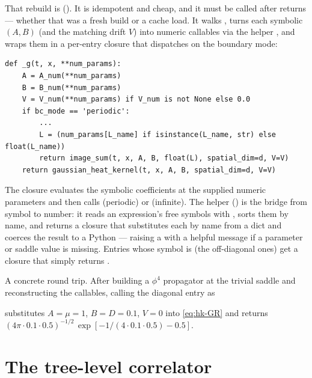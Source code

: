 That rebuild is  (). It is
idempotent and cheap, and it must be called after 
returns --- whether that was a fresh build or a cache load. It walks
, turns each symbolic $(A,B)$ (and the matching drift $V$) into
numeric callables via the helper , and wraps them in a
per-entry closure that dispatches on the boundary mode:

\begin{lstlisting}
def _g(t, x, **num_params):
    A = A_num(**num_params)
    B = B_num(**num_params)
    V = V_num(**num_params) if V_num is not None else 0.0
    if bc_mode == 'periodic':
        ...
        L = (num_params[L_name] if isinstance(L_name, str) else float(L_name))
        return image_sum(t, x, A, B, float(L), spatial_dim=d, V=V)
    return gaussian_heat_kernel(t, x, A, B, spatial_dim=d, V=V)
\end{lstlisting}

The closure evaluates the symbolic coefficients at the supplied numeric
parameters and then calls  (periodic) or
 (infinite). The helper 
() is the bridge from symbol to number: it reads an
expression's free symbols with , sorts them by name, and
returns a closure that substitutes each by name from a  dict
and coerces the result to a Python  --- raising a 
with a helpful message if a parameter or saddle value is missing. Entries whose
symbol is  (the off-diagonal ones) get a closure that simply returns
.

\begin{example}\label{ex:hk-gtx}
A concrete round trip. After building a $\phi^4$ propagator at the trivial
saddle and reconstructing the callables, calling the diagonal entry as
\begin{center}
\end{center}
substitutes $A=\mu=1$, $B=D=0.1$, $V=0$ into \eqref{eq:hk-GR} and returns
$(4\pi\cdot 0.1\cdot 0.5)^{-1/2}\,\exp[-1/(4\cdot 0.1\cdot 0.5) - 0.5]$.
\end{example}

\section{The tree-level correlator}\label{sec:hk-tree}


